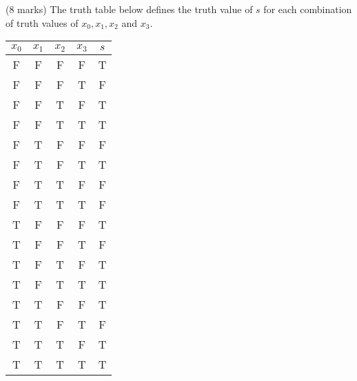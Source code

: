 \item (8 marks) The truth table below defines the truth value of $s$ for each combination of truth values of $x_0,x_1,x_2$ and $x_3$.

\begin{tabular}{|c|c|c|c||c|}
\hline
$x_0$ & $x_1$ & $x_2$ & $x_3$ & $s$\\
\hline
\hline
F & F & F & F & T\\
\hline
F & F & F & T & F\\
\hline
F & F & T & F & T\\
\hline
F & F & T & T & T\\
\hline
F & T & F & F & F\\
\hline
F & T & F & T & T\\
\hline
F & T & T & F & F\\
\hline
F & T & T & T & F\\
\hline
T & F & F & F & T \\
\hline
T & F & F & T & F\\
\hline
T & F & T & F & T\\
\hline
T & F & T & T & T\\
\hline
T & T & F & F & T\\
\hline
T & T & F & T & F\\
\hline
T & T & T & F & T\\
\hline
T & T & T & T & T\\
\hline
\end{tabular}

